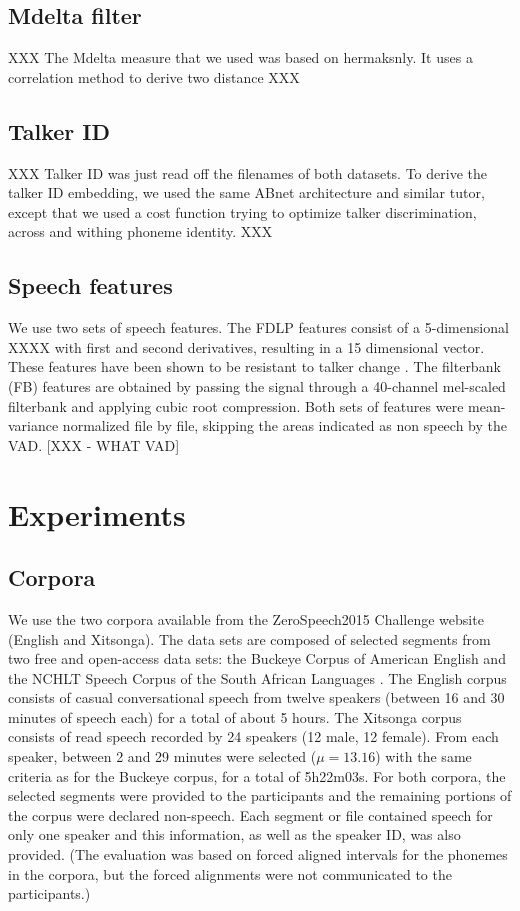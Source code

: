 \documentclass[a4paper]{article}
\begin{document}
\subsection{Mdelta filter}

XXX
The Mdelta measure that we used was based on hermaksnly. It uses a correlation method to derive two distance
XXX

\subsection{Talker ID}

XXX
Talker ID was just read off the filenames of both datasets. To derive the talker ID embedding, we used the same ABnet architecture and similar tutor, except that we used a cost function trying to optimize talker discrimination, across and withing phoneme identity.
XXX

\subsection{Speech features}

We use two sets of speech features. The FDLP features consist of a 5-dimensional XXXX with first and second derivatives, resulting in a 15 dimensional vector. These features have been shown to be resistant to talker change \cite{XXX}. The filterbank (FB) features are obtained by passing the signal through a 40-channel mel-scaled filterbank and applying cubic root compression. Both sets of features were mean-variance normalized file by file, skipping the areas indicated as non speech by the VAD.  [XXX - WHAT VAD]


\section{Experiments}


\subsection{Corpora}

We use the two corpora available from the ZeroSpeech2015 Challenge website (English and Xitsonga). 
The data sets are composed of selected segments from two free and open-access data sets: the Buckeye Corpus
of American English \cite{XXX} and the NCHLT Speech Corpus of the South African Languages \cite{XXX}. The English corpus consists of casual conversational speech from twelve speakers (between 16 and 30 minutes of speech each) for a total of about 5 hours. The Xitsonga corpus consists of read speech recorded by 24 speakers (12 male, 12 female). From each speaker, between 2 and 29 minutes were selected ($\mu=13.16$) with the same criteria as for the Buckeye corpus, for a total of 5h22m03s. For both corpora, the selected segments were provided to the participants and the remaining portions of the corpus were declared non-speech. Each segment or file contained speech for only one speaker and this information, as well as the speaker ID, was also provided. (The evaluation was based on forced aligned intervals for the phonemes in the corpora, but the forced alignments were not communicated to the participants.)
\end{document}
